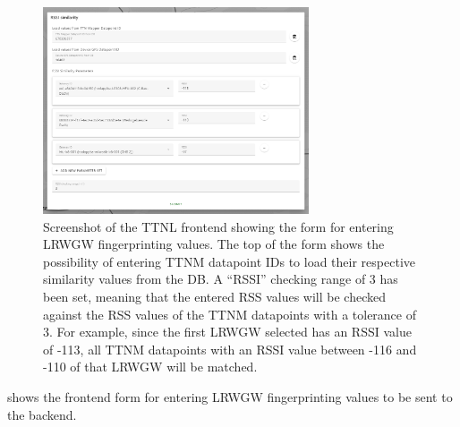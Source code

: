 \begin{figure}[htbp]
    \centering
    \includegraphics[width=0.7\textwidth]{pictures/ttn-locator/frontend/rssi_similarity_form.png}
    \caption[Screenshot of the \acl{TTNL} frontend showing the form for entering \acl{LRWGW} fingerprinting values]{
        Screenshot of the \ac{TTNL} frontend showing the form for entering \acl{LRWGW} fingerprinting values.
        The top of the form shows the possibility of entering \ac{TTNM} datapoint IDs to load their respective similarity values from the \ac{DB}.
        A ``RSSI'' checking range of 3 has been set, meaning that the entered \ac{RSS} values will be checked against the \ac{RSS} values of the \ac{TTNM} datapoints with a tolerance of 3.
        For example, since the first \acl{LRWGW} selected has an \ac{RSSI} value of -113, all \ac{TTNM} datapoints with an \ac{RSSI} value between -116 and -110 of that \acl{LRWGW} will be matched.
    }\label{fig:rssi-similarity-form-frontend}
\end{figure}

 shows the frontend form for entering \acl{LRWGW} fingerprinting values to be sent to the backend.

